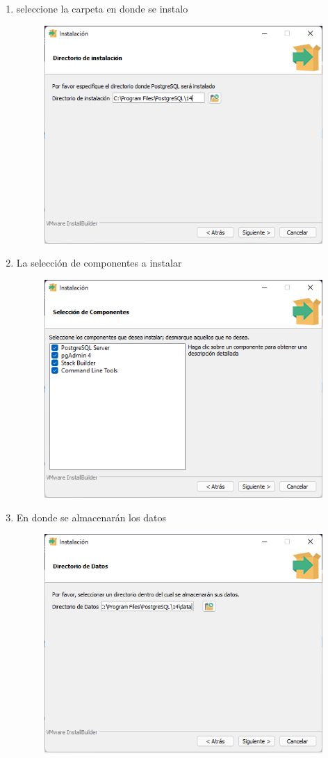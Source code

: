 \documentclass{exam}
\begin{document}
\begin{enumerate}
\begin{figure}[h]
        \end{figure}
        \newpage
        \item seleccione la carpeta en donde se instalo
        \begin{figure}[h]
            \centering
            \includegraphics[width = 10 cm]{imgSalazar/I_04.png}
        \end{figure}
        \item La selección de componentes a instalar
        \begin{figure}[h]
            \centering
            \includegraphics[width = 10 cm]{imgSalazar/I_05.png}
        \end{figure}
        \newpage
        \item En donde se almacenarán los datos
        \begin{figure}[h]
            \centering
            \includegraphics[width = 10 cm]{imgSalazar/I_06.png}

\end{figure}
\end{enumerate}
\end{document}
